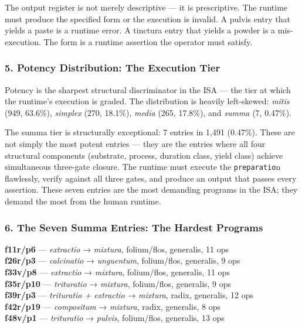 \documentclass[12pt,a4paper]{article}
\begin{document}
The output register is not merely descriptive --- it is prescriptive.
The runtime must produce the specified form or the execution is invalid.
A pulvis entry that yields a paste is a runtime error. A tinctura entry
that yields a powder is a mis-execution. The form is a runtime assertion
the operator must satisfy.

\hypertarget{potency-distribution-the-execution-tier}{%
\subsubsection{5. Potency Distribution: The Execution
Tier}\label{potency-distribution-the-execution-tier}}

Potency is the sharpest structural discriminator in the ISA --- the tier
at which the runtime's execution is graded. The distribution is heavily
left-skewed: \emph{mitis} (949, 63.6\%), \emph{simplex} (270, 18.1\%),
\emph{media} (265, 17.8\%), and \emph{summa} (7, 0.47\%).

The summa tier is structurally exceptional: 7 entries in 1,491 (0.47\%).
These are not simply the most potent entries --- they are the entries
where all four structural components (substrate, process, duration
class, yield class) achieve simultaneous three-gate closure. The runtime
must execute the \texttt{preparatio}n flawlessly, verify against all
three gates, and produce an output that passes every assertion. These
seven entries are the most demanding programs in the ISA; they demand
the most from the human runtime.

\hypertarget{the-seven-summa-entries-the-hardest-programs}{%
\subsubsection{6. The Seven Summa Entries: The Hardest
Programs}\label{the-seven-summa-entries-the-hardest-programs}}

\textbf{f11r/p6} --- \emph{extractio} → \emph{mixtura}, folium/flos,
generalis, 11 ops\\
\textbf{f26r/p3} --- \emph{calcinatio} → \emph{unguentum}, folium/flos,
generalis, 9 ops\\
\textbf{f33v/p8} --- \emph{extractio} → \emph{mixtura}, folium/flos,
generalis, 11 ops\\
\textbf{f35r/p10} --- \emph{trituratio} → \emph{mixtura}, folium/flos,
generalis, 9 ops\\
\textbf{f39r/p3} --- \emph{trituratio + extractio} → \emph{mixtura},
radix, generalis, 12 ops\\
\textbf{f42r/p19} --- \emph{compositum} → \emph{mixtura}, radix,
generalis, 8 ops\\
\textbf{f48v/p1} --- \emph{trituratio} → \emph{pulvis}, folium/flos,
generalis, 13 ops
\end{document}
